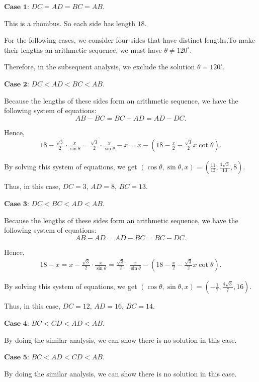 \begin{enumerate}
 $\textbf{Case 1}$: $DC = AD = BC = AB$.

 This is a rhombus. So each side has length $18$.

 For the following cases, we consider four sides that have distinct lengths.To make their lengths an arithmetic sequence, we must have $\theta \neq 120^\circ$.

 Therefore, in the subsequent analysis, we exclude the solution $\theta = 120^\circ$.

 $\textbf{Case 2}$: $DC < AD < BC < AB$.

 Because the lengths of these sides form an arithmetic sequence, we have the following system of equations:
 \[ AB - BC = BC - AD = AD - DC . \]

 Hence,
 \begin{eqnarray*} & 18 - \frac{\sqrt{3}}{2}\cdot\frac{x}{\sin \theta} = \frac{\sqrt{3}}{2}\cdot\frac{x}{\sin \theta} - x = x - \left( 18 - \frac{x}{2} - \frac{\sqrt{3}}{2} x \cot \theta \right) . & \end{eqnarray*}

 By solving this system of equations, we get $\left( \cos \theta , \sin \theta , x\right) = \left( \frac{11}{13} , \frac{4 \sqrt{3}}{13} , 8 \right)$.

 Thus, in this case, $DC = 3$, $AD = 8$, $BC = 13$.

 $\textbf{Case 3}$: $DC < BC < AD < AB$.

 Because the lengths of these sides form an arithmetic sequence, we have the following system of equations:
 \[ AB - AD = AD - BC = BC - DC . \]

 Hence,
 \begin{eqnarray*} & 18 - x = x - \frac{\sqrt{3}}{2}\cdot\frac{x}{\sin \theta} = \frac{\sqrt{3}}{2}\cdot\frac{x}{\sin \theta}  - \left( 18 - \frac{x}{2} - \frac{\sqrt{3}}{2} x \cot \theta \right) . & \end{eqnarray*}

 By solving this system of equations, we get $\left( \cos \theta , \sin \theta , x\right) = \left( - \frac{1}{7} , \frac{4 \sqrt{3}}{7} , 16 \right)$.

 Thus, in this case, $DC = 12$, $AD = 16$, $BC = 14$.

 $\textbf{Case 4}$: $BC < CD < AD < AB$.

 By doing the similar analysis, we can show there is no solution in this case.

 $\textbf{Case 5}$: $BC < AD < CD < AB$.

 By doing the similar analysis, we can show there is no solution in this case.


\end{enumerate}
